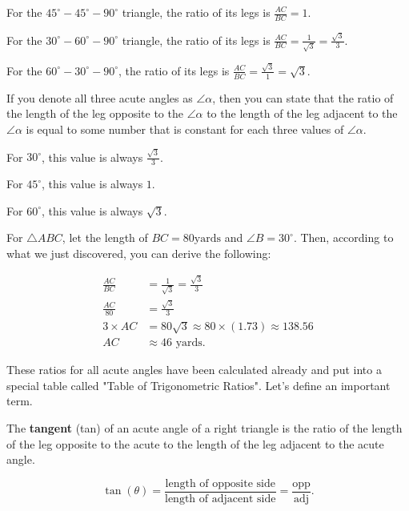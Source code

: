 For the $45^{\circ} - 45^{\circ} - 90^{\circ}$ triangle, the ratio of its
legs is $\frac{AC}{BC} = 1$.

For the $30^{\circ} - 60^{\circ} - 90^{\circ}$ triangle, the ratio of its
legs is $\frac{AC}{BC} = \frac{1}{\sqrt{3}} = \frac{\sqrt{3}}{3}$.

For the $60^{\circ} - 30^{\circ} - 90^{\circ}$, the ratio of its legs is
$\frac{AC}{BC} = \frac{\sqrt{3}}{1} = \sqrt{3}$.

If you denote all three acute angles as $\angle \alpha$, then you can state
that the ratio of the length of the leg opposite to the $\angle \alpha$ to the
length of the leg adjacent to the $\angle \alpha$ is equal to some number that
is constant for each three values of $\angle \alpha$.

For $30^{\circ}$, this value is always $\frac{\sqrt{3}}{3}$.

For $45^{\circ}$, this value is always $1$.

For $60^{\circ}$, this value is always $\sqrt{3}$.

\begin{example}
  \label{exm:ratios_of_sides_of_special_triangles}

  For $\triangle ABC$, let the length of $BC = 80 \textrm{yards}$ and $\angle B
  = 30^{\circ}$. Then, according to what we just discovered, you can derive the
  following:

  \begin{align*}
    \frac{AC}{BC} &= \frac{1}{\sqrt{3}} = \frac{\sqrt{3}}{3} \\
    \frac{AC}{80} &= \frac{\sqrt{3}}{3} \\
    3 \times AC   &= 80 \sqrt{3} \approx 80 \times (1.73) \approx 138.56 \\
    AC &\approx 46 \textrm{ yards}
  .\end{align*}
\end{example}

These ratios for all acute angles have been calculated already and put into a
special table called "Table of Trigonometric Ratios". Let's define an important
term.

\begin{definition}[Tangent]
  \label{def:tangent}

  The \textbf{tangent} (tan) of an acute angle of a right triangle is the ratio
  of the length of the leg opposite to the acute to the length of the leg
  adjacent to the acute angle.

  \[ \tan (\theta) = \frac{\textrm{length of opposite side}}{\textrm{length of adjacent side}}
                   = \frac{\textrm{opp}}{\textrm{adj}} . \]
\end{definition}

